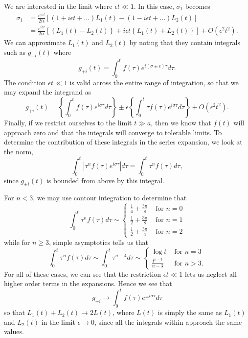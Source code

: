 \documentclass[letterpaper,11pt,onecolumn,twoside,titlepage]{article}
\begin{document}
\begin{appendix}
We are interested in the limit where $\epsilon t \ll 1$. In this case, $\sigma_1$ becomes
\[ \begin{split}
\sigma_1 &= \frac{e^{i\sigma t}}{2i\epsilon} \left[(1+i\epsilon t + \ldots) L_1(t) - (1 - i\epsilon t + \ldots) L_2(t)\right] \\
         &= \frac{e^{i\sigma t}}{2i\epsilon} \left[ \left\{L_1(t) - L_2(t)\right\} + i\epsilon t \left\{L_1(t) + L_2(t)\right\} \right] + O(\epsilon^2 t^2).
\end{split} \]
We can approximate $L_1(t)$ and $L_2(t)$ by noting that they contain integrals such as $g_{+i}(t)$ where
\[
g_{+i}(t) = \int_0^t f(\tau) e^{i(\sigma \pm \epsilon) \tau} d\tau.
\]
The condition $\epsilon t \ll 1$ is valid across the entire range of integration, so that we may expand the integrand as
\[
g_{+i}(t) = \left\{\int_0^t f(\tau) e^{i\sigma \tau} d\tau \right\} \pm \epsilon \left\{\int_0^t \tau f(\tau) e^{i\sigma \tau} d\tau \right\} + O(\epsilon^2 t^2).
\]
Finally, if we restrict ourselves to the limit $t \gg a$, then we know that $f(t)$ will approach zero and that the integrals will converge to tolerable limits. To determine the contribution of these integrals in the series expansion, we look at the norm,
\[
\int_0^t |\tau^n f(\tau) e^{i\sigma \tau}| d\tau = \int_0^t \tau^n f(\tau) d\tau,
\]
since $g_{\pm i}(t)$ is bounded from above by this integral.

For $n < 3$, we may use contour integration to determine that
\[
\int_0^t \tau^n f(\tau) d\tau \sim
\begin{cases}
\frac{1}{4} + \frac{3 \pi}{8} & \text{ for } n = 0 \\
\frac{1}{2} + \frac{3 \pi}{8} & \text{ for } n = 1 \\
\frac{1}{2} + \frac{3 \pi}{4} & \text{ for } n = 2
\end{cases}
\]
while for $n \ge 3$, simple asymptotics tells us that
\[
\int_0^t \tau^n f(\tau) d\tau \sim \int_0^t \tau^{n-4} d\tau \sim
\begin{cases}
\log t & \text{ for } n = 3 \\
\frac{t^{n - 3}}{n-3} & \text{ for } n > 3.
\end{cases}
\]
For all of these cases, we can see that the restriction $\epsilon t \ll 1$ lets us neglect all higher order terms in the expansions. Hence we see that
\[
g_{\pm i} \rightarrow \int_0^t f(\tau) e^{\pm i \sigma \tau} d\tau
\]
so that $L_1(t) + L_2(t) \rightarrow 2L(t)$, where $L(t)$ is simply the same as $L_1(t)$ and $L_2(t)$ in the limit $\epsilon \rightarrow 0$, since all the integrals within approach the same values.


\end{appendix}
\end{document}
